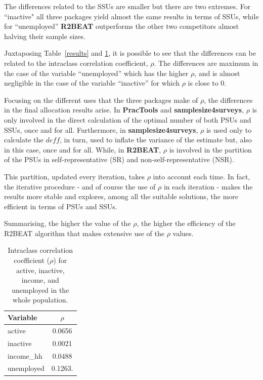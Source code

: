 The differences related to the SSUs are smaller but there are two extremes.
For ``inactive" all three packages yield almost the same results in terms of SSUs, while for ``unemployed” \textbf{R2BEAT} outperforms the other two competitors almost halving their sample sizes.

Juxtaposing Table~\ref{results} and \ref{comparison:cv_rho}, it is possible to see that the differences can be related to the intraclass correlation coefficient, $\rho$.
The differences are maximum in the case of the variable “unemployed” which has the higher $\rho$, and is almost negligible in the case of the variable “inactive” for which $\rho$ is close to 0.

Focusing on the different uses that the three packages make of $\rho$, the differences in the final allocation results arise.
In \textbf{PracTools} and \textbf{samplesize4surveys}, $\rho$ is only involved in the direct calculation of the optimal number of both PSUs and SSUs, once and for all.
Furthermore, in \textbf{samplesize4surveys}, $\rho$ is used only to calculate the $deff$, in turn, used to inflate the variance of the estimate but, also in this case, once and for all.
While, in \textbf{R2BEAT}, $\rho$ is involved in the partition of the PSUs in self-representative (SR) and non-self-representative (NSR). 

This partition, updated every iteration, takes $\rho$  into account each time. In fact, the iterative procedure - and of course the use of $\rho$ in each iteration - makes the results more stable and explores, among all the suitable solutions, the more efficient in terms of PSUs and SSUs.

Summarising, the higher the value of the $\rho$, the higher the efficiency of the R2BEAT algorithm that makes extensive use of the $\rho$ values.

\begin{table}[h!]
	\caption{Intraclass correlation coefficient ($\rho$) for active, inactive, income, and unemployed in the whole population.}
	\centering
	\begin{tabular}{|l||c|}
		\hline
		Variable    & $\rho$ \\ 
            \hline
		active      & 0.0656 \\ 
            inactive    & 0.0021 \\
		income\_hh  & 0.0488 \\ 
            unemployed  & 0.1263. 
            \\
            \hline
	\end{tabular}
	\label{comparison:cv_rho}
\end{table}	




